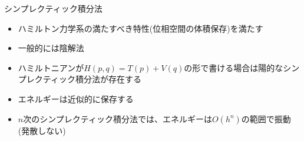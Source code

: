 \begin{frame}[t,fragile]{シンプレクティック積分法}
  \begin{itemize}
    \setlength{\itemsep}{1em}
  \item ハミルトン力学系の満たすべき特性(位相空間の体積保存)を満たす
  \item 一般的には陰解法
  \item ハミルトニアンが$H(p,q) = T(p) + V(q)$の形で書ける場合は陽的なシンプレクティック積分法が存在する
  \item エネルギーは近似的に保存する
  \item $n$次のシンプレクティック積分法では、エネルギーは$O(h^n)$の範囲で振動(発散しない)
  \end{itemize}
\end{frame}
